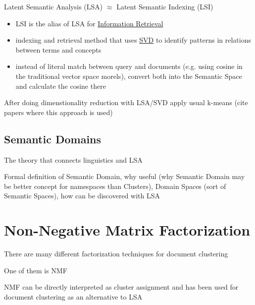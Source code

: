 Latent Semantic Analysis (LSA) $\approx$ Latent Semantic Indexing (LSI)

\begin{itemize}
\itemsep1pt\parskip0pt
\item
  LSI is the alias of LSA for \href{Information Retrieval}{Information   Retrieval}
\item
  indexing and retrieval method that uses
  \href{Singular Value Decomposition}{SVD} to identify patterns in
  relations between terms and concepts
\item
  instead of literal match between query and documents (e.g. using
  cosine in the traditional vector space morels), convert both into the
  Semantic Space and calculate the cosine there
\end{itemize}



After doing dimenstionality reduction with LSA/SVD apply usual k-means (cite papers where 
this approach is used) 



\subsection{Semantic Domains}

The theory that connects linguistics and LSA \cite{gliozzo2009semantic}

Formal definition of Semantic Domain, why useful (why Semantic Domain may 
be better concept for namespaces than Clusters), 
Domain Spaces (sort of Semantic Spaces), how can be discovered with LSA




\section{Non-Negative Matrix Factorization}

There are many different factorization techniques for document clustering \cite{osinski2006improving}

One of them is NMF \cite{lee1999nnmf}

NMF can be directly interpreted as cluster assignment and has been 
used for document clustering as an alternative to LSA \cite{xu2003document}





